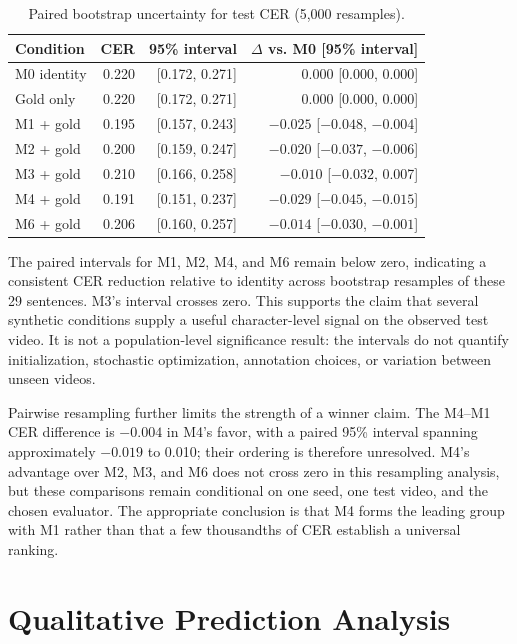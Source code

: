 \documentclass[12pt, a4paper, twoside, openany]{report}
\begin{document}
\begin{table}[H]
	\centering
	\caption{Paired bootstrap uncertainty for test CER (5,000 resamples).}
	\label{tab:bootstrap-cer}
	\small
	\begin{tabular}{lrrr}
		\toprule
		\textbf{Condition} & \textbf{CER} & \textbf{95\% interval} & \textbf{$\Delta$ vs. M0 [95\% interval]} \\
		\midrule
		M0 identity & 0.220 & [0.172, 0.271] & 0.000 [0.000, 0.000] \\
		Gold only & 0.220 & [0.172, 0.271] & 0.000 [0.000, 0.000] \\
		M1 + gold & 0.195 & [0.157, 0.243] & $-0.025$ [$-0.048$, $-0.004$] \\
		M2 + gold & 0.200 & [0.159, 0.247] & $-0.020$ [$-0.037$, $-0.006$] \\
		M3 + gold & 0.210 & [0.166, 0.258] & $-0.010$ [$-0.032$, 0.007] \\
		M4 + gold & 0.191 & [0.151, 0.237] & $-0.029$ [$-0.045$, $-0.015$] \\
		M6 + gold & 0.206 & [0.160, 0.257] & $-0.014$ [$-0.030$, $-0.001$] \\
		\bottomrule
	\end{tabular}
\end{table}

The paired intervals for M1, M2, M4, and M6 remain below zero, indicating a consistent CER reduction relative to identity across bootstrap resamples of these 29 sentences. M3's interval crosses zero. This supports the claim that several synthetic conditions supply a useful character-level signal on the observed test video. It is not a population-level significance result: the intervals do not quantify initialization, stochastic optimization, annotation choices, or variation between unseen videos.

Pairwise resampling further limits the strength of a winner claim. The M4--M1 CER difference is $-0.004$ in M4's favor, with a paired 95\% interval spanning approximately $-0.019$ to 0.010; their ordering is therefore unresolved. M4's advantage over M2, M3, and M6 does not cross zero in this resampling analysis, but these comparisons remain conditional on one seed, one test video, and the chosen evaluator. The appropriate conclusion is that M4 forms the leading group with M1 rather than that a few thousandths of CER establish a universal ranking.

\section{Qualitative Prediction Analysis}
\end{document}
